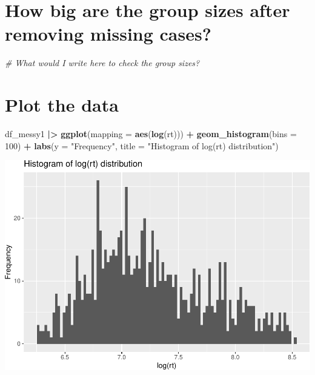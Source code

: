 \documentclass[
]{article}
\newenvironment{Shaded}{\begin{snugshade}}{\end{snugshade}}
\newcommand{\AttributeTok}[1]{\textcolor[rgb]{0.13,0.29,0.53}{#1}}
\newcommand{\CommentTok}[1]{\textcolor[rgb]{0.56,0.35,0.01}{\textit{#1}}}
\newcommand{\DecValTok}[1]{\textcolor[rgb]{0.00,0.00,0.81}{#1}}
\newcommand{\FunctionTok}[1]{\textcolor[rgb]{0.13,0.29,0.53}{\textbf{#1}}}
\newcommand{\NormalTok}[1]{#1}
\newcommand{\SpecialCharTok}[1]{\textcolor[rgb]{0.81,0.36,0.00}{\textbf{#1}}}
\newcommand{\StringTok}[1]{\textcolor[rgb]{0.31,0.60,0.02}{#1}}
\begin{document}
\hypertarget{how-big-are-the-group-sizes-after-removing-missing-cases}{%
\section{How big are the group sizes after removing missing
cases?}\label{how-big-are-the-group-sizes-after-removing-missing-cases}}

\begin{Shaded}
\begin{Highlighting}[]
\CommentTok{\# What would I write here to check the group sizes?}
\end{Highlighting}
\end{Shaded}

\hypertarget{plot-the-data}{%
\section{Plot the data}\label{plot-the-data}}

\begin{Shaded}
\begin{Highlighting}[]
\NormalTok{df\_messy1 }\SpecialCharTok{|\textgreater{}}
  \FunctionTok{ggplot}\NormalTok{(}\AttributeTok{mapping =} \FunctionTok{aes}\NormalTok{(}\FunctionTok{log}\NormalTok{(rt))) }\SpecialCharTok{+}
  \FunctionTok{geom\_histogram}\NormalTok{(}\AttributeTok{bins =} \DecValTok{100}\NormalTok{) }\SpecialCharTok{+} 
  \FunctionTok{labs}\NormalTok{(}\AttributeTok{y =} \StringTok{"Frequency"}\NormalTok{,}
       \AttributeTok{title =} \StringTok{"Histogram of log(rt) distribution"}\NormalTok{)}
\end{Highlighting}
\end{Shaded}

\includegraphics{L5_Checking_Assumptions_pdf_files/figure-latex/unnamed-chunk-19-1.pdf}
\end{document}
